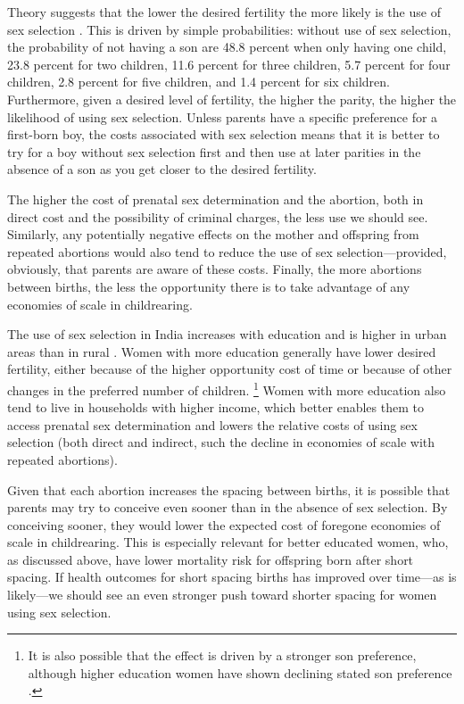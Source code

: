 Theory suggests that the lower the desired fertility the more likely is the use of sex 
selection \citep{Portner2015b}.
This is driven by simple probabilities:
without use of sex selection, the probability of not having a son are 48.8 percent when
only having one child, 23.8 percent for two children, 11.6 percent for three children, 
5.7 percent for four children, 2.8 percent for five children, and 1.4 percent for six 
children.
Furthermore, given a desired level of fertility, the higher the parity, the higher the
likelihood of using sex selection.
Unless parents have a specific preference for a first-born boy, the costs associated with 
sex selection means that it is better to try for a boy without sex selection first and 
then use at later parities in the absence of a son as you get closer to the desired 
fertility.

The higher the cost of prenatal sex determination and the abortion, both in direct cost
and the possibility of criminal charges, the less use we should see.
Similarly, any potentially negative effects on the mother and offspring from repeated
abortions would also tend to reduce the use of sex selection---provided, obviously, that
parents are aware of these costs.
Finally, the more abortions between births, the less the opportunity there is to take
advantage of any economies of scale in childrearing.


The use of sex selection in India increases with education and is higher in urban
areas than in rural
\citep{das_gupta97,retherford03b,jha06,Guilmoto2009a,Bongaarts2013,Portner2015b,
Jayachandran2017}.
Women with more education generally have lower desired fertility, either because of the
higher opportunity cost of time or because of other changes in the preferred number of
children.%
\footnote{
It is also possible that the effect is driven by a stronger son preference, although 
higher education women have shown declining stated son preference \citep{bhat03,pande07}.
}
Women with more education also tend to live in households with higher income,
which better enables them to access prenatal sex determination and lowers the relative
costs of using sex selection (both direct and indirect, such the decline in 
economies of scale with repeated abortions).

Given that each abortion increases the spacing between births, it is possible that
parents may try to conceive even sooner than in the absence of sex selection.
By conceiving sooner, they would lower the expected cost of foregone economies of scale in 
childrearing.
This is especially relevant for better educated women, who, as discussed above, have
lower mortality risk for offspring born after short spacing.
If health outcomes for short spacing births has improved over time---as is likely---we
should see an even stronger push toward shorter spacing for women using sex selection.

